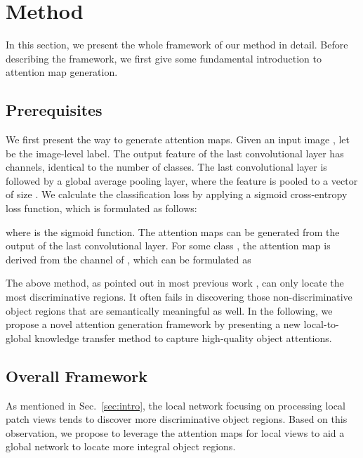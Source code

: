 \documentclass[10pt,twocolumn,letterpaper]{article}
\newcommand{\secref}[1]{Sec.~\ref{#1}}
\begin{document}
\section{Method}

In this section, we present the whole framework of our method in detail.
Before describing the framework, we first give some fundamental 
introduction to attention map generation.


\subsection{Prerequisites}
We first present the way to generate attention maps.
Given an input image , let  be the image-level label.
The output feature  of the last convolutional layer has  channels, 
identical to the number of classes.  
The last convolutional layer is followed by a global average pooling layer, 
where the feature  is pooled to a vector  of size .
We calculate the classification loss by applying a sigmoid cross-entropy loss function, 
which is formulated as follows: 

where  is the sigmoid function.
The attention maps can be generated from the output of the last convolutional layer.
For some class , the attention map  is derived from the  channel of , 
which can be formulated as
 


The above method, as pointed out in most previous work 
\cite{wei2017object,hou2018self,jiang2019integral,ahn2018learning},
can only locate the most discriminative regions.
It often fails in discovering those non-discriminative 
object regions that are semantically meaningful as well.
In the following, we propose a novel attention generation framework by
presenting a new local-to-global knowledge transfer method to
capture high-quality object attentions.



\subsection{Overall Framework}

As mentioned in \secref{sec:intro}, the local network focusing on
processing local patch views tends to discover more discriminative object regions.
Based on this observation, we propose to leverage the attention maps 
for local views to aid a global network to locate more integral 
object regions.
\end{document}
